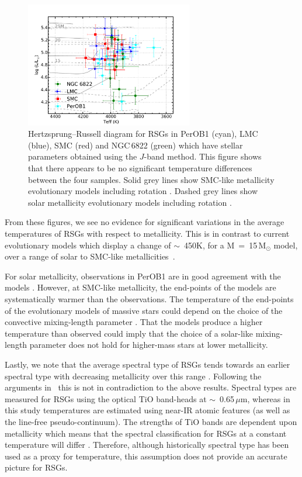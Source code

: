 \begin{figure}
 \centering
\includegraphics[width=0.65\textwidth]{ngc6822/N6822_HRD_all_thesis}
\caption[Hertzsprung--Russell diagram from four different environments]{
Hertzsprung--Russell diagram for RSGs in PerOB1 (cyan), LMC (blue), SMC (red) and NGC\,6822 (green) which have stellar parameters obtained using the $J$-band method.
This figure shows that there appears to be no significant temperature differences between the four samples.
Solid grey lines show SMC-like metallicity evolutionary models including rotation
\protect\citep{2013A&A...558A.103G}.
Dashed grey lines show solar metallicity evolutionary models including rotation
\protect\citep{2012A&A...537A.146E}.\label{fig:HRD}
        }
\end{figure}


From these figures, we see no evidence for significant variations in the average temperatures of RSGs with respect to metallicity.
This is in contrast to current evolutionary models which display a change of $\sim$~450K,
for a M~=~15\,M$_{\odot}$ model,
over a range of solar to SMC-like metallicities~\citep{2012A&A...537A.146E,2013A&A...558A.103G}.

For solar metallicity, observations in PerOB1 are in good agreement with the models
\citep[see Figure 9 in][]{2014ApJ...788...58G}.
However, at SMC-like metallicity, the end-points of the models are systematically warmer than the observations.
The temperature of the end-points of the evolutionary models of massive stars could depend on the choice of the convective mixing-length parameter
\citep{1992A&AS...96..269S}.
That the models produce a higher temperature than observed could imply that the choice of a solar-like mixing-length parameter does not hold for higher-mass stars at lower metallicity.

Lastly, we note that the average spectral type of RSGs tends towards an earlier spectral type with decreasing metallicity over this range
\citep{1979ApJ...231..384H,2012AJ....144....2L}.
Following the arguments in~\citet{1979ApJ...231..384H} this is not in contradiction to the above results.
Spectral types are measured for RSGs using the optical TiO band-heads at
$\sim$~0.65\,$\mu$m,
whereas in this study temperatures are estimated using near-IR atomic features
(as well as the line-free pseudo-continuum).
The strengths of TiO bands are dependent upon metallicity which means that
the spectral classification for RSGs at a constant temperature will differ
\citep{2013ApJ...767....3D}.
Therefore, although historically spectral type has been used as a proxy for temperature, this assumption does not provide an accurate picture for RSGs.

